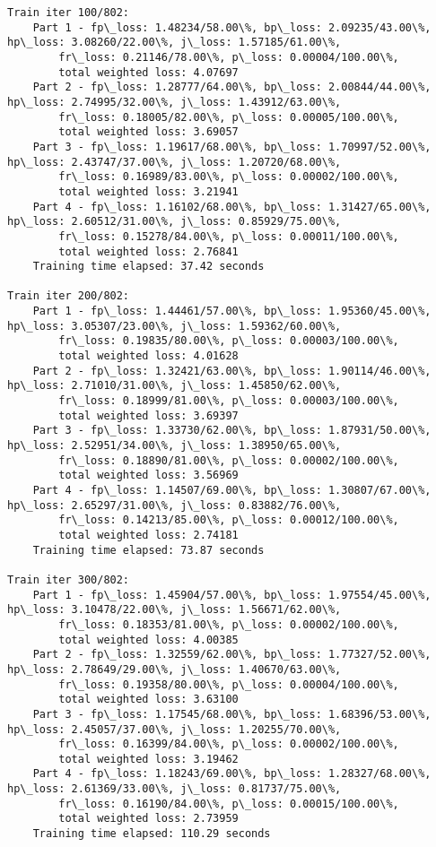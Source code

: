 \documentclass[11pt]{article}
\begin{document}
\begin{Verbatim}[commandchars=\\\{\}]
Train iter 100/802:
	Part 1 - fp\_loss: 1.48234/58.00\%, bp\_loss: 2.09235/43.00\%, hp\_loss: 3.08260/22.00\%, j\_loss: 1.57185/61.00\%, 
		fr\_loss: 0.21146/78.00\%, p\_loss: 0.00004/100.00\%, 
		total weighted loss: 4.07697
	Part 2 - fp\_loss: 1.28777/64.00\%, bp\_loss: 2.00844/44.00\%, hp\_loss: 2.74995/32.00\%, j\_loss: 1.43912/63.00\%, 
		fr\_loss: 0.18005/82.00\%, p\_loss: 0.00005/100.00\%, 
		total weighted loss: 3.69057
	Part 3 - fp\_loss: 1.19617/68.00\%, bp\_loss: 1.70997/52.00\%, hp\_loss: 2.43747/37.00\%, j\_loss: 1.20720/68.00\%, 
		fr\_loss: 0.16989/83.00\%, p\_loss: 0.00002/100.00\%, 
		total weighted loss: 3.21941
	Part 4 - fp\_loss: 1.16102/68.00\%, bp\_loss: 1.31427/65.00\%, hp\_loss: 2.60512/31.00\%, j\_loss: 0.85929/75.00\%, 
		fr\_loss: 0.15278/84.00\%, p\_loss: 0.00011/100.00\%, 
		total weighted loss: 2.76841
	Training time elapsed: 37.42 seconds

Train iter 200/802:
	Part 1 - fp\_loss: 1.44461/57.00\%, bp\_loss: 1.95360/45.00\%, hp\_loss: 3.05307/23.00\%, j\_loss: 1.59362/60.00\%, 
		fr\_loss: 0.19835/80.00\%, p\_loss: 0.00003/100.00\%, 
		total weighted loss: 4.01628
	Part 2 - fp\_loss: 1.32421/63.00\%, bp\_loss: 1.90114/46.00\%, hp\_loss: 2.71010/31.00\%, j\_loss: 1.45850/62.00\%, 
		fr\_loss: 0.18999/81.00\%, p\_loss: 0.00003/100.00\%, 
		total weighted loss: 3.69397
	Part 3 - fp\_loss: 1.33730/62.00\%, bp\_loss: 1.87931/50.00\%, hp\_loss: 2.52951/34.00\%, j\_loss: 1.38950/65.00\%, 
		fr\_loss: 0.18890/81.00\%, p\_loss: 0.00002/100.00\%, 
		total weighted loss: 3.56969
	Part 4 - fp\_loss: 1.14507/69.00\%, bp\_loss: 1.30807/67.00\%, hp\_loss: 2.65297/31.00\%, j\_loss: 0.83882/76.00\%, 
		fr\_loss: 0.14213/85.00\%, p\_loss: 0.00012/100.00\%, 
		total weighted loss: 2.74181
	Training time elapsed: 73.87 seconds

Train iter 300/802:
	Part 1 - fp\_loss: 1.45904/57.00\%, bp\_loss: 1.97554/45.00\%, hp\_loss: 3.10478/22.00\%, j\_loss: 1.56671/62.00\%, 
		fr\_loss: 0.18353/81.00\%, p\_loss: 0.00002/100.00\%, 
		total weighted loss: 4.00385
	Part 2 - fp\_loss: 1.32559/62.00\%, bp\_loss: 1.77327/52.00\%, hp\_loss: 2.78649/29.00\%, j\_loss: 1.40670/63.00\%, 
		fr\_loss: 0.19358/80.00\%, p\_loss: 0.00004/100.00\%, 
		total weighted loss: 3.63100
	Part 3 - fp\_loss: 1.17545/68.00\%, bp\_loss: 1.68396/53.00\%, hp\_loss: 2.45057/37.00\%, j\_loss: 1.20255/70.00\%, 
		fr\_loss: 0.16399/84.00\%, p\_loss: 0.00002/100.00\%, 
		total weighted loss: 3.19462
	Part 4 - fp\_loss: 1.18243/69.00\%, bp\_loss: 1.28327/68.00\%, hp\_loss: 2.61369/33.00\%, j\_loss: 0.81737/75.00\%, 
		fr\_loss: 0.16190/84.00\%, p\_loss: 0.00015/100.00\%, 
		total weighted loss: 2.73959
	Training time elapsed: 110.29 seconds


\end{Verbatim}
\end{document}
